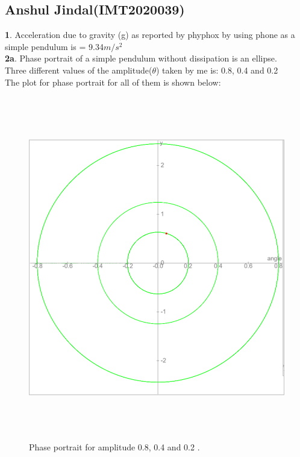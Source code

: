 \documentclass[11pt]{scrartcl} %
\begin{document}
\newpage
\subsection{Anshul Jindal(IMT2020039)}

\textbf{1}.
Acceleration due to gravity (g) as reported by phyphox by using phone as a simple pendulum is = 9.34$m/s^2$\\

\textbf{2a}.
Phase portrait of a simple pendulum without dissipation is an ellipse.\\
Three different values of the amplitude($\theta$) taken by me is: 0.8, 0.4 and 0.2\\

The plot for phase portrait for all of them is shown below:

\begin{figure}[h] %
	\centering
	\includegraphics[width=\textwidth, height=15cm]{2a.PNG} %
	\caption{Phase portrait for amplitude 0.8, 0.4 and 0.2 .}
\end{figure}
\end{document}
